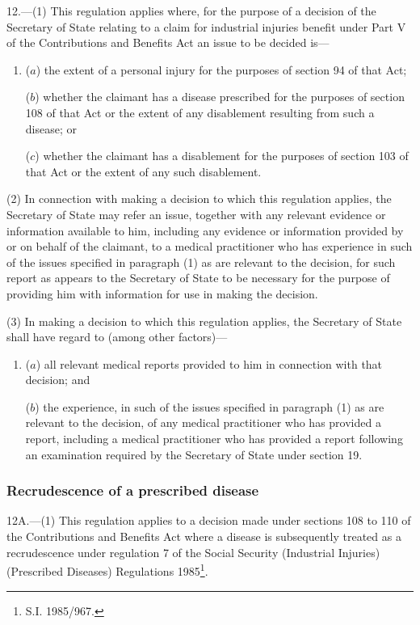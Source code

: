 \documentclass[12pt,a4paper]{article}
\begin{document}
12.—(1) This regulation applies where, for the purpose of a decision of the Secretary of State relating to a claim for industrial injuries benefit under Part V of the Contributions and Benefits Act an issue to be decided is—
\begin{enumerate}\item[]
($a$) the extent of a personal injury for the purposes of section 94 of that Act;

($b$) whether the claimant has a disease prescribed for the purposes of section 108 of that Act or the extent of any disablement resulting from such a disease; or

($c$) whether the claimant has a disablement for the purposes of section 103 of that Act or the extent of any such disablement.
\end{enumerate}

(2) In connection with making a decision to which this regulation applies, the Secretary of State may refer an issue, together with any relevant evidence or information available to him, including any evidence or information provided by or on behalf of the claimant, to a medical practitioner who has experience in such of the issues specified in paragraph (1) as are relevant to the decision, for such report as appears to the Secretary of State to be necessary for the purpose of providing him with information for use in making the decision.

(3) In making a decision to which this regulation applies, the Secretary of State shall have regard to (among other factors)—
\begin{enumerate}\item[]
($a$) all relevant medical reports provided to him in connection with that decision; and

($b$) the experience, in such of the issues specified in paragraph (1) as are relevant to the decision, of any medical practitioner who has provided a report, including a medical practitioner who has provided a report following an examination required by the Secretary of State under section 19.
\end{enumerate}

\subsubsection[12A. Recrudescence of a prescribed disease]{Recrudescence of a prescribed disease}

12A.---(1)  This regulation applies to a decision made under sections 108 to 110 of the Contributions and Benefits Act where a disease is subsequently treated as a recrudescence under regulation 7 of the Social Security (Industrial Injuries) (Prescribed Diseases) Regulations 1985\footnote{\frenchspacing S.I. 1985/967.}.
\end{document}
